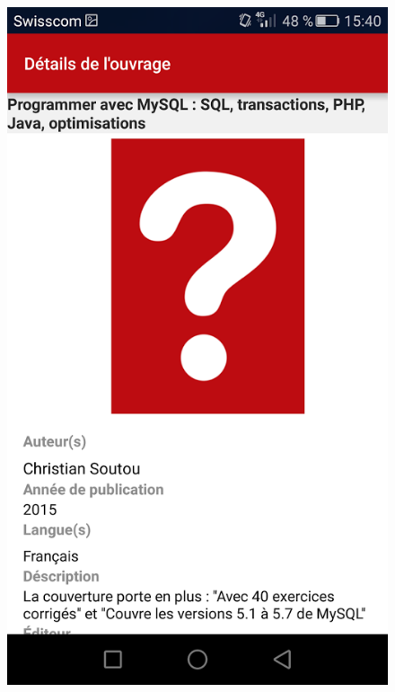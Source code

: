 \documentclass[10pt]{beamer}
\begin{document}
\begin{frame}
\begin{columns}[T]
\begin{column}{.65\textwidth}
\begin{columns}[T]
                \begin{column}{.3\textwidth}
                    \begin{figure}
                        \includegraphics[width=1\textwidth]{images/bibapp3.png}
                    \end{figure}
                \end{column}
            \end{columns}
		\end{column}

\end{columns}
\end{frame}
\end{document}
